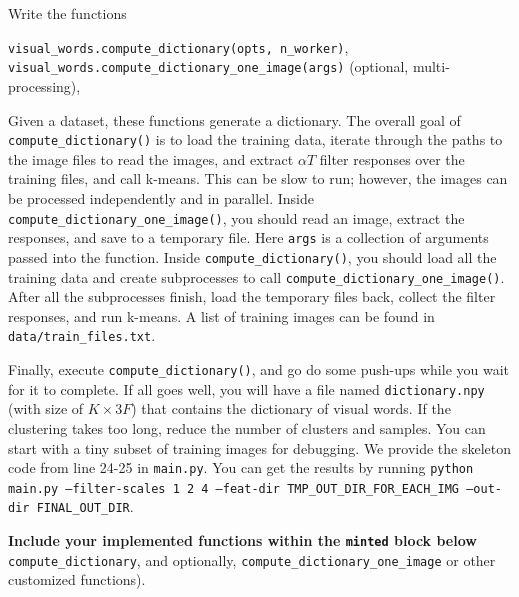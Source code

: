 \documentclass[11pt]{article}
\numberwithin{equation}{section} %
\numberwithin{figure}{section} %
\numberwithin{table}{section} %
\begin{document}
\par {}
Write the functions
\begin{center}
  {\tt visual\_words.compute\_dictionary(opts, n\_worker)}, \\
  {\tt visual\_words.compute\_dictionary\_one\_image(args)} (optional, multi-processing),
\end{center}
Given a dataset, these functions generate a dictionary. 
The overall goal of {\tt compute\_dictionary()} is to load the training data, iterate through the paths to the image files to read the images, and extract $\alpha T$ filter responses over the training files, and call k-means.
This can be slow to run; however, the images can be processed independently and in parallel.
Inside {\tt compute\_dictionary\_one\_image()}, you should read an image, extract the responses, and save to a temporary file. Here {\tt args} is a collection of arguments passed into the function.
Inside {\tt compute\_dictionary()}, you should load all the training data and create subprocesses to call {\tt compute\_dictionary\_one\_image()}.
After all the subprocesses finish, load the temporary files back, collect the filter responses, and run k-means. A list of training images can be found in {\tt data/train\_files.txt}.

Finally, execute {\tt compute\_dictionary()}, and go do some push-ups while you wait for it to complete. 
If all goes well, you will have a file named {\tt dictionary.npy} (with size of $K \times 3F$) that contains the dictionary of visual words. 
If the clustering takes too long, reduce the number of clusters and samples. You can start with a tiny subset of training images for debugging. We provide the skeleton code from line 24-25 in {\tt main.py}. You can get the results by running {\tt python main.py --filter-scales 1 2 4 --feat-dir TMP\_OUT\_DIR\_FOR\_EACH\_IMG --out-dir FINAL\_OUT\_DIR}.


\textbf{Include your implemented functions  within the \texttt{minted} block below} 
{\tt compute\_dictionary}, and optionally, {\tt compute\_dictionary\_one\_image} or other customized functions).

\end{document}
